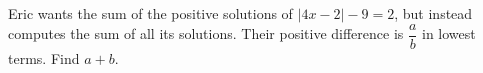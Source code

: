 Eric wants the sum of the positive solutions of $|4x-2|-9=2$, but instead computes the sum of all its solutions. Their positive difference is $\dfrac{a}{b}$ in lowest terms. Find $a+b$.
